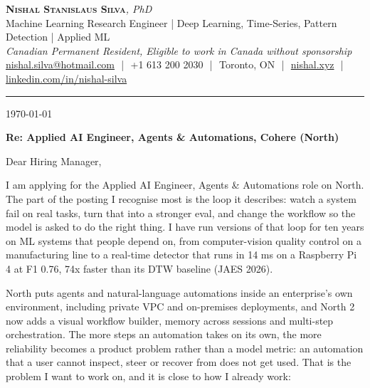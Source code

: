\documentclass[11pt]{article}
\makeatletter
\newcommand{\clName}{Nishal Stanislaus Silva}
\newcommand{\clEmail}{nishal.silva@hotmail.com}
\newcommand{\clPhone}{+1 613 200 2030}
\newcommand{\clCity}{Toronto, ON}
\newcommand{\clSite}{https://nishal.xyz}
\newcommand{\clLinkedIn}{https://www.linkedin.com/in/nishal-silva}
\newcommand{\clStatus}{Canadian Permanent Resident, Eligible to work in Canada without sponsorship}
\newcommand{\clTagline}{Machine Learning Research Engineer | Deep Learning, Time-Series, Pattern Detection | Applied ML}
\newcommand{\clRole}{Applied AI Engineer, Agents \& Automations}
\newcommand{\clCompany}{Cohere}
\newcommand{\clTeam}{North}
\makeatother
\begin{document}
\pagestyle{empty}

\begin{center}
    {\LARGE \scshape \textbf{\clName}}{\large \textit{, PhD}}
    \\[1pt]
    {\small \clTagline}
    \\[1pt]
    {\footnotesize\textit{\clStatus}}
    \\[1pt]
    {\small
    \href{mailto:\clEmail}{\clEmail}
    \,\,|\,\, \clPhone
    \,\,|\,\, \clCity
    \,\,|\,\, \href{\clSite}{nishal.xyz}
    \,\,|\,\, \href{\clLinkedIn}{linkedin.com/in/nishal-silva}}
\end{center}

\rule{\linewidth}{0.4pt}\vspace{0.6em}

\today

\textbf{Re: \clRole{}, \clCompany{} (\clTeam{})}

Dear Hiring Manager,

I am applying for the \clRole{} role on \clTeam{}. The part of the posting I recognise most is the loop it describes: watch a system fail on real tasks, turn that into a stronger eval, and change the workflow so the model is asked to do the right thing. I have run versions of that loop for ten years on ML systems that people depend on, from computer-vision quality control on a manufacturing line to a real-time detector that runs in 14 ms on a Raspberry Pi 4 at F1 0.76, 74x faster than its DTW baseline (JAES 2026).

\clTeam{} puts agents and natural-language automations inside an enterprise's own environment, including private VPC and on-premises deployments, and North 2 now adds a visual workflow builder, memory across sessions and multi-step orchestration. The more steps an automation takes on its own, the more reliability becomes a product problem rather than a model metric: an automation that a user cannot inspect, steer or recover from does not get used. That is the problem I want to work on, and it is close to how I already work:
\end{document}
